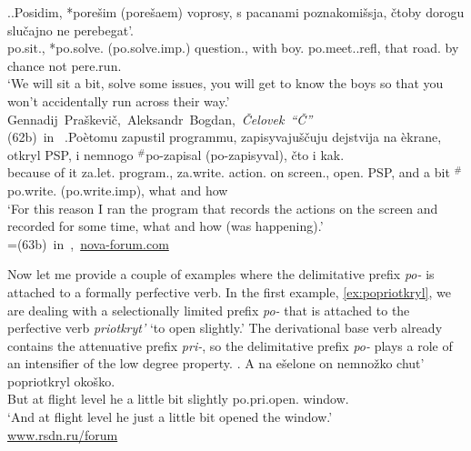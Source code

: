 \ex.\label{ex:po:Tat}\ag.\label{ex:po:Tat1}Posidim, *pore\v{s}im (\textsuperscript{\JudgeOK}pore\v{s}aem\textsuperscript{\PF}) voprosy, s pacanami poznakomi\v{s}sja, \v{c}toby dorogu slu\v{c}ajno ne perebegat'.\\
po.sit., *po.solve. (\textsuperscript{\JudgeOK}po.solve.imp.) question., with boy. po.meet..refl, that road. {by chance} not pere.run.\\
\trans `We will sit a bit, solve some issues, you will get to know the boys so that you won't accidentally run across their way.'\\\hbox{}\hfill\hbox{Gennadij Pra\v{s}kevi\v{c}, Aleksandr Bogdan, \textit{\v{C}elovek ``\v{C}''}}\\\hbox{}\hfill\hbox{(62b) in \citealt{Tatevosov:09}}
\bg.\label{ex:po:Tat2}Po\`{e}tomu zapustil programmu, zapisyvaju\v{s}\v{c}uju dejstvija na \`{e}krane, otkryl PSP, i nemnogo $^\#$po-zapisal (\textsuperscript{\JudgeOK}po-zapisyval\textsuperscript{\PF}), \v{c}to i kak.\\
{because of it} za.let. program., za.write. action. on screen., open. PSP, and {a bit} $^\#$po.write. (\textsuperscript{\JudgeOK}po.write.imp), what and how\\
\trans `For this reason I ran the program that records the actions on the screen and recorded for some time, what and how (was happening).'\\\hbox{}\hfill\hbox{=(63b) in \citealt{Tatevosov:09}, \url{nova-forum.com}}

Now let me provide a couple of examples where the delimitative prefix \textit{po-} is attached to a formally perfective verb. In the first example, \ref{ex:popriotkryl}, we are dealing with a selectionally limited prefix \textit{po-} that is attached to the perfective verb \textit{priotkryt'\textsuperscript{\PF}} `to open slightly.' The derivational base verb already contains the attenuative prefix \textit{pri-}, so the delimitative prefix \textit{po-} plays a role of an intensifier of the low degree property. 
\exg. \label{ex:popriotkryl}A na e\v{s}elone on nemno\v{z}ko chut' popriotkryl oko\v{s}ko.\\
But at {flight level} he {a little bit} {slightly} po.pri.open. window.\\
\trans `And at flight level he just a little bit opened the window.'\\\hbox{}\hfill\hbox{\url{www.rsdn.ru/forum}}

